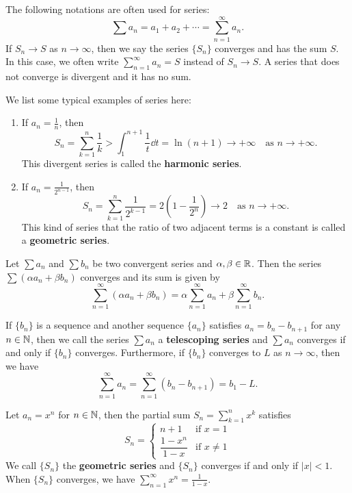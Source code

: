 \documentclass[a4paper]{ctexart}
\begin{document}
    \begin{mynot}
        The following notations are often used for series:
        \[
        \sum a_n = a_1 + a_2 + \cdots = \sum_{n=1}^\infty a_n.
        \]
        If $S_n \to S$ as $n\to \infty$, then we say the series $\{S_n\}$ converges and has the sum $S$. In this case, we often write $\displaystyle \sum_{n=1}^\infty a_n = S$ instead of $S_n \to S$. A series that does not converge is divergent and it has no sum.
    \end{mynot}
    \begin{myex}
        We list some typical examples of series here:
        \begin{enumerate}
            \item If $\displaystyle a_n = \frac{1}{n}$, then
            \[
            S_n = \sum_{k=1}^n \frac{1}{k} > \int_1^{n+1} \frac{1}{t} \dd t = \ln(n+1) \to +\infty \quad \text{as } n\to +\infty.
            \]
            This divergent series is called the \textbf{harmonic series}.
            \item If $\displaystyle a_n = \frac{1}{2^{n-1}}$, then
            \[
            S_n = \sum_{k=1}^n \frac{1}{2^{k-1}} = 2\left( 1 - \frac{1}{2^n} \right) \to 2 \quad \text{as } n\to +\infty.
            \]
            This kind of series that the ratio of two adjacent terms is a constant is called a \textbf{geometric series}.
        \end{enumerate}
    \end{myex}
    \begin{mythm}
        Let $\sum a_n$ and $\sum b_n$ be two convergent series and $\alpha,\beta \in \mathbb{R}$. Then the series $\sum (\alpha a_n + \beta b_n)$ converges and its sum is given by
        \[
        \sum_{n=1}^\infty (\alpha a_n + \beta b_n) = \alpha \sum_{n=1}^\infty a_n + \beta \sum_{n=1}^\infty b_n.
        \]
    \end{mythm}
    \begin{mythm}
        If $\{b_n\}$ is a sequence and another sequence $\{a_n\}$ satisfies $a_n = b_n - b_{n+1}$ for any $n\in \mathbb{N}$, then we call the series $\sum a_n$ a \textbf{telescoping series} and $\sum a_n$ converges if and only if $\{b_n\}$ converges. Furthermore, if $\{b_n\}$ converges to $L$ as $n\to \infty$, then we have
        \[
        \sum_{n=1}^\infty a_n = \sum_{n=1}^\infty (b_n - b_{n+1}) =  b_1 - L.
        \]
    \end{mythm}
    \begin{mythm}
        Let $a_n = x^n$ for $n\in \mathbb{N}$, then the partial sum $\displaystyle S_n = \sum_{k=1}^n x^k$ satisfies
        \[
        S_n = \begin{cases}
            n+1 & \text{if } x=1\\
            \dfrac{1-x^{n}}{1-x} & \text{if } x\neq 1
        \end{cases}
        \]
        We call $\{S_n\}$ the \textbf{geometric series} and $\{S_n\}$ converges if and only if $|x|<1$. When $\{S_n\}$ converges, we have $\displaystyle \sum_{n=1}^\infty x^n = \frac{1}{1-x}$.
    \end{mythm}
\end{document}
